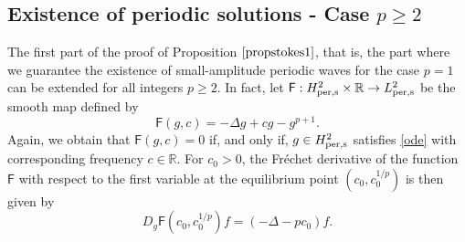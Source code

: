 \documentclass[12pt,reqno,a4paper]{amsart} %
\numberwithin{equation}{section}
\numberwithin{figure}{section}
\begin{document}
	\subsection{Existence of periodic solutions - Case $p\geq2$} The first part of the proof of Proposition $\ref{propstokes1}$, that is, the part where we guarantee the existence of small-amplitude periodic waves for the case $p=1$ can be extended for all integers $p\geq 2$. In fact,  let $\mathsf{F}: H_{\rm per,s}^{2} \times \mathbb{R} \rightarrow L_{\rm per,s}^2$ be the smooth map defined by
\begin{equation}\label{F-lyapunov12}
	\mathsf{F}(g,c) = -\Delta g+cg-g^{p+1}.
\end{equation}
Again, we obtain that $\mathsf{F}(g,c) = 0$ if, and only if, $g \in H_{\rm per,s}^{2}$ satisfies \eqref{ode} with corresponding frequency $c \in \mathbb{R}$. For $c_0>0$, the Fr\'echet derivative of the function $\mathsf{F}$ with respect to the first variable at the equilibrium point $(c_0,c_0^{1/p})$ is then given by
\begin{equation}\label{Dg2}
	D_g \mathsf{F}(c_0, c_0^{1/p}) f = (-\Delta - pc_0) f.
\end{equation}
\end{document}
